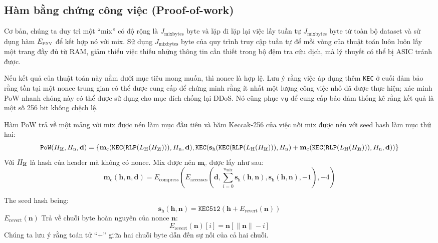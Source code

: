 \documentclass[9pt,oneside]{amsart}
\newcommand{\hcancel}[1]{%
    \tikz[baseline=(tocancel.base)]{
        \node[inner sep=0pt,outer sep=0pt] (tocancel) {#1};
        \draw[black] (tocancel.south west) -- (tocancel.north east);
    }%
}%
\begin{document}
\subsection{Hàm bằng chứng công việc (Proof-of-work)}
Cơ bản, chúng ta duy trì một ``mix'' có độ rộng là $J_{\mathrm{mixbytes}}$ byte và lặp đi lặp lại việc lấy tuần tự $J_{\mathrm{mixbytes}}$ byte từ toàn bộ dataset và sử dụng hàm $E_\text{\tiny FNV}$ để kết hợp nó với mix. Sử dụng $J_{\mathrm{mixbytes}}$ byte của quy trình truy cập tuần tự để mỗi vòng của thuật toán luôn luôn lấy một trang đầy đủ từ RAM, giảm thiểu việc thiếu những thông tin cần thiết trong bộ đệm tra cứu dịch, mà lý thuyết có thể bị ASIC tránh được.

Nếu kết quả của thuật toán này nằm dưới mục tiêu mong muốn, thì nonce là hợp lệ. Lưu ý rằng việc áp dụng thêm \texttt{KEC} ở cuối đảm bảo rằng tồn tại một nonce trung gian có thể được cung cấp để chứng minh rằng ít nhất một lượng công việc nhỏ đã được thực hiện; xác minh PoW nhanh chóng này có thể được sử dụng cho mục đích chống lại DDoS. Nó cũng phục vụ để cung cấp bảo đảm thống kê rằng kết quả là một số 256 bit không chệch lệ.
 
Hàm PoW trả về một mảng với mix được nén làm mục đầu tiên và băm Keccak-256 của việc nối mix được nén với seed hash làm mục thứ hai:
\begin{equation}
 \mathtt{PoW}(H_{\hcancel{n}}, H_{\mathrm{n}}, \mathbf{d}) = \lbrace \mathbf{m}_{\mathrm{c}}(\mathtt{KEC}(\mathtt{RLP}(L_{\mathrm{H}}(H_{\hcancel{n}}))), H_{\mathrm{n}}, \mathbf{d}), \texttt{KEC}(\mathbf{s}_{\mathrm{h}}(\mathtt{KEC}(\mathtt{RLP}(L_{\mathrm{H}}(H_{\hcancel{n}}))), H_{\mathrm{n}}) + \mathbf{m}_{\mathrm{c}}(\mathtt{KEC}(\mathtt{RLP}(L_{\mathrm{H}}(H_{\hcancel{n}}))), H_{\mathrm{n}}, \mathbf{d})) \rbrace
\end{equation}
Với $H_{\hcancel{n}}$ là hash của header mà không có nonce. Mix được nén $\mathbf{m}_{\mathrm{c}}$ được lấy như sau:
\begin{equation}
 \mathbf{m}_{\mathrm{c}}(\mathbf{h}, \mathbf{n}, \mathbf{d}) = E_{\mathrm{compress}}(E_{\mathrm{accesses}}(\mathbf{d}, \sum_{i = 0}^{n_{\mathrm{mix}}} \mathbf{s}_{\mathrm{h}}(\mathbf{h}, \mathbf{n}), \mathbf{s}_{\mathrm{h}}(\mathbf{h}, \mathbf{n}), -1), -4)
\end{equation}


The seed hash being:
\begin{equation}
 \mathbf{s}_{\mathrm{h}}(\mathbf{h}, \mathbf{n}) = \texttt{KEC512}(\mathbf{h} + E_{\mathrm{revert}}(\mathbf{n}))
\end{equation}
$E_{\mathrm{revert}}(\mathbf{n})$ Trả về chuỗi byte hoàn nguyên của nonce $\mathbf{n}$:
\begin{equation}
 E_{\mathrm{revert}}(\mathbf{n})[i] = \mathbf{n}[\lVert \mathbf{n} \rVert -i]
\end{equation}
Chúng ta lưu ý rằng toán tử ``$+$'' giữa hai chuỗi byte dẫn đến sự nối của cả hai chuỗi.
\end{document}
